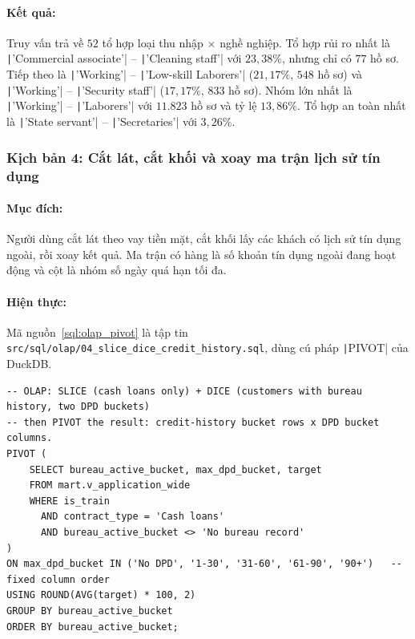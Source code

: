 \paragraph{Kết quả:} Truy vấn trả về $52$ tổ hợp loại thu nhập $\times$ nghề nghiệp. Tổ hợp rủi ro nhất là \texttt|'Commercial associate'| -- \texttt|'Cleaning staff'| với $23{,}38\%$, nhưng chỉ có $77$ hồ sơ. Tiếp theo là \texttt|'Working'| -- \texttt|'Low-skill Laborers'| ($21{,}17\%$, $548$ hồ sơ) và \texttt|'Working'| -- \texttt|'Security staff'| ($17{,}17\%$, $833$ hồ sơ). Nhóm lớn nhất là \texttt|'Working'| -- \texttt|'Laborers'| với $11.823$ hồ sơ và tỷ lệ $13{,}86\%$. Tổ hợp an toàn nhất là \texttt|'State servant'| -- \texttt|'Secretaries'| với $3{,}26\%$.

\subsubsection*{Kịch bản 4: Cắt lát, cắt khối và xoay ma trận lịch sử tín dụng}
\paragraph{Mục đích:} Người dùng cắt lát theo vay tiền mặt, cắt khối lấy các khách có lịch sử tín dụng ngoài, rồi xoay kết quả. Ma trận có hàng là số khoản tín dụng ngoài đang hoạt động và cột là nhóm số ngày quá hạn tối đa.
\paragraph{Hiện thực:} Mã nguồn~\ref{sql:olap_pivot} là tập tin \texttt{src/sql/olap/}\allowbreak\texttt{04\_slice\_dice\_credit\_history.sql}, dùng cú pháp \texttt|PIVOT| của DuckDB.

\begin{listing}[H]
	\footnotesize
	\begin{verbatim}
-- OLAP: SLICE (cash loans only) + DICE (customers with bureau history, two DPD buckets)
-- then PIVOT the result: credit-history bucket rows x DPD bucket columns.
PIVOT (
    SELECT bureau_active_bucket, max_dpd_bucket, target
    FROM mart.v_application_wide
    WHERE is_train
      AND contract_type = 'Cash loans'
      AND bureau_active_bucket <> 'No bureau record'
)
ON max_dpd_bucket IN ('No DPD', '1-30', '31-60', '61-90', '90+')   -- fixed column order
USING ROUND(AVG(target) * 100, 2)
GROUP BY bureau_active_bucket
ORDER BY bureau_active_bucket;
\end{verbatim}
	\caption{Truy vấn cắt lát, cắt khối và xoay ma trận lịch sử tín dụng}
	\label{sql:olap_pivot}
\end{listing}

